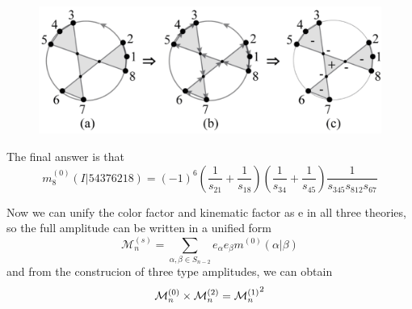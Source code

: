 \documentclass{beamer}
\begin{document}
\begin{frame}
    
    \begin{figure}
        \centering
        \includegraphics[width=1\linewidth]{6.png}
    \end{figure}
    The final answer is that
    \begin{equation*}
        m_8^{(0)}(I|54376218)=(-1)^6\left(\frac{1}{s_{21}}+\frac{1}{s_{18}}\right)\left(\frac{1}{s_{34}}+\frac{1}{s_{45}}\right)\frac{1}{s_{345}s_{812}s_{67}}
    \end{equation*}
\end{frame}
\begin{frame}
    Now we can unify the color factor and kinematic factor as e in all three theories, so the full amplitude can be written in a unified form
    \begin{equation*}
       \mathcal{M}_n^{(s)}=\sum_{\alpha,\beta\in S_{n-2}}e_\alpha e_\beta m^{(0)}(\alpha|\beta)
    \end{equation*}
    and from the construcion of three type amplitudes, we can obtain
    \begin{equation*}
        {\cal M}^{(0)}_n\times{\cal M}^{(2)}_n={{\cal M}^{(1)}_n}^2
    \end{equation*}

\end{frame}
\end{document}
